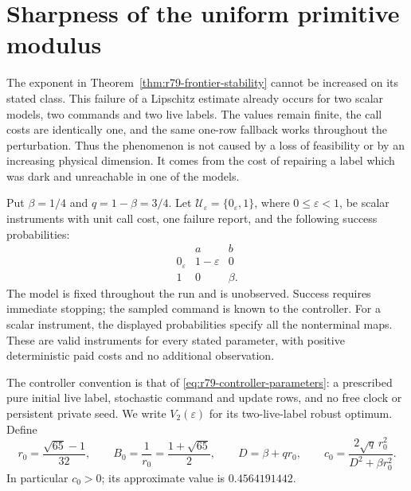 \section{Sharpness of the uniform primitive modulus}
\label{sec:r80-sharp-stability}

The exponent in Theorem~\ref{thm:r79-frontier-stability} cannot be
increased on its stated class.  This failure of a Lipschitz estimate
already occurs for two scalar models, two commands and two live labels.
The values remain finite, the call costs are identically one, and the
same one-row fallback works throughout the perturbation.  Thus the
phenomenon is not caused by a loss of feasibility or by an increasing
physical dimension.  It comes from the cost of repairing a label which
was dark and unreachable in one of the models.

Put $\beta=1/4$ and $q=1-\beta=3/4$.  Let
$\mathcal U_\varepsilon=\{0_\varepsilon,1\}$, where
$0\le\varepsilon<1$, be scalar instruments with unit call cost,
one failure report, and the following success probabilities:
\begin{equation}\label{eq:r80-sharp-models}
\begin{array}{c|cc}
 &a&b\\ \hline
 0_\varepsilon&1-\varepsilon&0\\
 1&0&\beta.
\end{array}
\end{equation}
The model is fixed throughout the run and is unobserved.  Success
requires immediate stopping; the sampled command is known to the
controller.  For a scalar instrument, the displayed probabilities
specify all the nonterminal maps.  These are valid instruments for
every stated parameter, with positive deterministic paid costs and
no additional observation.

The controller convention is that of
\eqref{eq:r79-controller-parameters}: a prescribed pure initial live
label, stochastic command and update rows, and no free clock or
persistent private seed.  We write $V_2(\varepsilon)$ for its
two-live-label robust optimum.  Define
\begin{equation}\label{eq:r80-sharp-constants}
 r_0=\frac{\sqrt{65}-1}{32},\qquad
 B_0=\frac1{r_0}=\frac{1+\sqrt{65}}2,\qquad
 D=\beta+qr_0,\qquad
 c_0=\frac{2\sqrt q\,r_0^2}{D^2+\beta r_0^2}.
\end{equation}
In particular $c_0>0$; its approximate value is $0.4564191442$.

